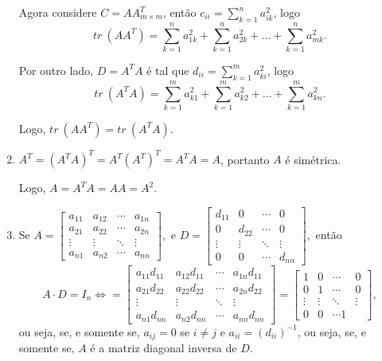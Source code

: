 \documentclass{report}
\begin{document}
\begin{enumerate}
Agora considere $C=AA^{T}_{m \times m}$, então
$c_{ii}=\sum_{k=1}^{n} a^2_{ik}$, logo $$tr \ (AA^{T})=
\sum_{k=1}^{n} a^2_{1k} + \sum_{k=1}^{n} a^2_{2k}+ \ldots +
\sum_{k=1}^{n} a^2_{mk}.$$

Por outro lado, $D=A^{T}A$ é tal que $d_{ii}=\sum_{k=1}^{m}
a^2_{ki}$, logo $$tr \ (A^{T}A)= \sum_{k=1}^{m} a^2_{k1} +
\sum_{k=1}^{m} a^2_{k2}+ \ldots + \sum_{k=1}^{m} a^2_{kn}.$$

Logo, $tr \ (AA^{T})=tr \ (A^{T}A)$.


\item $A^T=(A^{T}A)^T=A^T (A^T)^T=A^TA=A$, portanto $A$ é
simétrica.

Logo, $A=A^TA=AA=A^2$.



\item Se $A=\left[
\begin{array}{cccc}
a_{11} & a_{12} & \cdots  & a_{1n} \\
a_{21} & a_{22} & \cdots  & a_{2n} \\
\vdots  & \vdots  & \ddots  & \vdots  \\
a_{n1} & a_{n2} & \cdots  & a_{nn}
\end{array}
\right],$ e $D=\left[
\begin{array}{cccc}
d_{11} & 0 & \cdots  & 0 \\
0 & d_{22} & \cdots  & 0 \\
\vdots  & \vdots  & \ddots  & \vdots  \\
0 & 0 & \cdots  & d_{nn}
\end{array}
\right],$ então $$A \cdot D =I_n \Leftrightarrow= \left[
\begin{array}{cccc}
a_{11} d_{11}& a_{12}d_{11} & \cdots  & a_{1n} d_{11}\\
a_{21} d_{22}& a_{22}d_{22} & \cdots  & a_{2n}d_{22} \\
\vdots  & \vdots  & \ddots  & \vdots  \\
a_{n1} d_{nn}& a_{n2}d_{nn} & \cdots  & a_{nn}d_{nn}
\end{array}
\right]= \left[
\begin{array}{cccc}
1 & 0 & \cdots  & 0 \\
0 & 1 & \cdots  & 0 \\
\vdots  & \vdots  & \ddots  & \vdots  \\
0 & 0 & \cdots  1
\end{array}
\right],$$ ou seja, se, e somente se, $a_{ij} = 0$ se $i \ne j$ e
$a_{ii} = (d_{ii})^{-1}$, ou seja, se, e somente se, $A$ é a
matriz diagonal inversa de $D$.



\end{enumerate}
\end{document}
